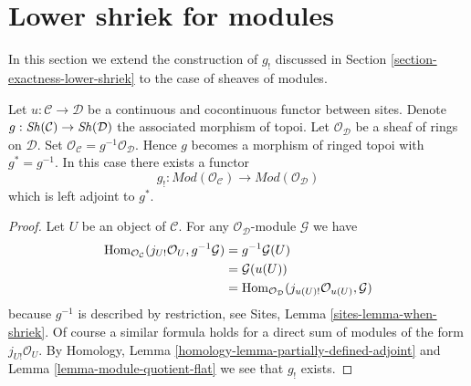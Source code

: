 \section{Lower shriek for modules}
\label{section-lower-shriek-modules}

\noindent
In this section we extend the construction of $g_!$ discussed
in Section \ref{section-exactness-lower-shriek} to the case of
sheaves of modules.

\begin{lemma}
\label{lemma-lower-shriek-modules}
Let $u : \mathcal{C} \to \mathcal{D}$ be a continuous and cocontinuous
functor between sites. Denote
$g : \mathop{\mathit{Sh}}\nolimits(\mathcal{C}) \to \mathop{\mathit{Sh}}\nolimits(\mathcal{D})$ the associated
morphism of topoi. Let $\mathcal{O}_\mathcal{D}$ be a sheaf of rings
on $\mathcal{D}$. Set
$\mathcal{O}_\mathcal{C} = g^{-1}\mathcal{O}_\mathcal{D}$.
Hence $g$ becomes a morphism of ringed topoi with $g^* = g^{-1}$.
In this case there exists a functor
$$
g_! :
\textit{Mod}(\mathcal{O}_\mathcal{C})
\longrightarrow
\textit{Mod}(\mathcal{O}_\mathcal{D})
$$
which is left adjoint to $g^*$.
\end{lemma}

\begin{proof}
Let $U$ be an object of $\mathcal{C}$. For any
$\mathcal{O}_\mathcal{D}$-module $\mathcal{G}$ we have
\begin{align*}
\mathop{\mathrm{Hom}}\nolimits_{\mathcal{O}_\mathcal{C}}(j_{U!}\mathcal{O}_U, g^{-1}\mathcal{G})
& =
g^{-1}\mathcal{G}(U) \\
& =
\mathcal{G}(u(U)) \\
& =
\mathop{\mathrm{Hom}}\nolimits_{\mathcal{O}_\mathcal{D}}(j_{u(U)!}\mathcal{O}_{u(U)}, \mathcal{G})
\end{align*}
because $g^{-1}$ is described by restriction, see
Sites, Lemma \ref{sites-lemma-when-shriek}.
Of course a similar formula holds for a direct sum of modules
of the form $j_{U!}\mathcal{O}_U$. By
Homology, Lemma \ref{homology-lemma-partially-defined-adjoint}
and
Lemma \ref{lemma-module-quotient-flat}
we see that $g_!$ exists.
\end{proof}

